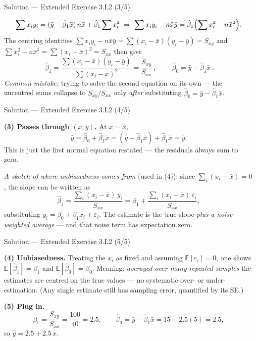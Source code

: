 \documentclass[aspectratio=169,11pt]{beamer}
\begin{document}
\begin{frame}{Solution --- Extended Exercise 3.L2 (3/5)}
  \begin{solutionbox}
    \[
      \sum x_i y_i=(\bar y-\hat\beta_1\bar x)\,n\bar x+\hat\beta_1\sum x_i^2
      \;\Rightarrow\;
      \sum x_i y_i-n\bar x\bar y
        =\hat\beta_1\Bigl(\sum x_i^2-n\bar x^2\Bigr).
    \]
    The centring identities
    $\sum x_i y_i-n\bar x\bar y=\sum(x_i-\bar x)(y_i-\bar y)=S_{xy}$ and
    $\sum x_i^2-n\bar x^2=\sum(x_i-\bar x)^2=S_{xx}$ then give
    \[
      \boxed{\ \hat\beta_1=\dfrac{\sum(x_i-\bar x)(y_i-\bar y)}{\sum(x_i-\bar x)^2}
      =\dfrac{S_{xy}}{S_{xx}}\ },\qquad
      \boxed{\ \hat\beta_0=\bar y-\hat\beta_1\bar x\ }.
    \]
    \textit{Common mistake:} trying to solve the second equation on its
    own --- the uncentred sums collapse to $S_{xy}/S_{xx}$ only
    \emph{after} substituting $\hat\beta_0=\bar y-\hat\beta_1\bar x$.
  \end{solutionbox}
\end{frame}

\begin{frame}{Solution --- Extended Exercise 3.L2 (4/5)}
  \begin{solutionbox}
    \textbf{(3) Passes through $(\bar x,\bar y)$.} At $x=\bar x$,
    \[
      \hat y=\hat\beta_0+\hat\beta_1\bar x
      =(\bar y-\hat\beta_1\bar x)+\hat\beta_1\bar x=\bar y.
    \]
    This is just the first normal equation restated --- the residuals
    always sum to zero.

    \medskip
    \emph{A sketch of where unbiasedness comes from} (used in (4)):
    since $\sum_i(x_i-\bar x)=0$, the slope can be written as
    \[
      \hat\beta_1=\frac{\sum_i (x_i-\bar x)\,y_i}{S_{xx}}
      =\beta_1+\frac{\sum_i (x_i-\bar x)\,\varepsilon_i}{S_{xx}} ,
    \]
    substituting $y_i=\beta_0+\beta_1x_i+\varepsilon_i$. The estimate is
    the true slope \emph{plus a noise-weighted average} --- and that noise
    term has expectation zero.
  \end{solutionbox}
\end{frame}

\begin{frame}{Solution --- Extended Exercise 3.L2 (5/5)}
  \begin{solutionbox}
    \textbf{(4) Unbiasedness.} Treating the $x_i$ as fixed and assuming
    $\mathbb{E}[\varepsilon_i]=0$, one shows $\mathbb{E}[\hat\beta_1]=\beta_1$
    and $\mathbb{E}[\hat\beta_0]=\beta_0$. Meaning: \emph{averaged over
    many repeated samples} the estimates are centred on the true values
    --- no systematic over- or under-estimation. (Any single estimate
    still has sampling error, quantified by its SE.)

    \textbf{(5) Plug in.}
    \[
      \hat\beta_1=\frac{S_{xy}}{S_{xx}}=\frac{100}{40}=2.5,\qquad
      \hat\beta_0=\bar y-\hat\beta_1\bar x=15-2.5(5)=2.5,
    \]
    so $\hat y=2.5+2.5\,x$.
  \end{solutionbox}
\end{frame}
\end{document}
